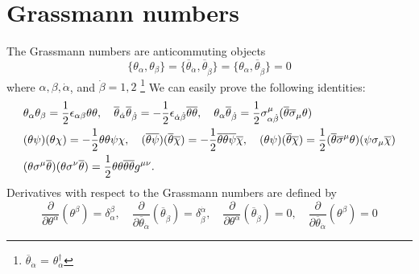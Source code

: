 \documentclass[12pt]{report}
\begin{document}
\section{Grassmann numbers} \label{app: grassmann_numbers}
The Grassmann numbers are anticommuting objects
\begin{equation}
\{\theta_{\alpha}, \theta_{\beta}\} = \{\overline{\theta}_{\dot{\alpha}}, \overline{\theta}_{\dot{\beta}}\} = \{\theta_{\alpha}, \overline{\theta}_{\dot{\beta}}\} = 0
\end{equation}
where $\alpha, \beta, \dot{\alpha}$, and $\dot{\beta} = 1, 2$ \footnote{$\overline{\theta}_{\dot{\alpha}}$ = $\theta_{\alpha}^{\dagger}$ }
We can easily prove the following identities:
\begin{align}
&\theta_{\alpha} \theta_{\beta} = \frac{1}{2} \epsilon_{\alpha \beta} \theta \theta, \quad 
\overline{\theta}_{\dot{\alpha}} \overline{\theta}_{\dot{\beta}} = -\frac{1}{2} \epsilon_{\dot{\alpha} \dot{\beta}} \overline{\theta} \overline{\theta}, \quad 
\theta_{\alpha} \overline{\theta}_{\dot{\beta}} = \frac{1}{2} \sigma^{\mu}_{\alpha \dot{\beta}} (\overline{\theta} \overline{\sigma}_{\mu} \theta) \notag \\
& (\theta \psi)(\theta \chi) = - \frac{1}{2}\theta \theta \psi \chi, \quad 
(\overline{\theta} \overline{\psi})(\overline{\theta} \overline{\chi}) = - \frac{1}{2} \overline{\theta} \overline{\theta} \overline{\psi} \overline{\chi}, \quad 
(\theta \psi)(\overline{\theta} \overline{\chi}) = \frac{1}{2}(\overline{\theta} \overline{\sigma}^{\mu} \theta)(\psi \sigma_{\mu} \overline{\chi}) \notag \\
& (\theta \sigma^{\mu} \overline{\theta})(\theta \sigma^{\nu} \overline{\theta}) = \frac{1}{2} \theta \theta \overline{\theta} \overline{\theta} g^{\mu \nu} .
\end{align}
Derivatives with respect to the Grassmann numbers are defined by
\begin{equation}
\frac{\partial}{\partial \theta^{\alpha}}(\theta^{\beta}) = \delta^{\beta}_{\alpha}, \quad
\frac{\partial}{\partial \overline{\theta}_{\dot{\alpha}}}(\overline{\theta}_{\dot{\beta}}) = \delta^{\dot{\alpha}}_{\dot{\beta}}, \quad 
\frac{\partial}{\partial \theta^{\alpha}}(\overline{\theta}_{\dot{\beta}}) = 0, \quad 
\frac{\partial}{\partial \overline{\theta}_{\dot{\alpha}}}(\theta^{\beta}) = 0
\end{equation}
\end{document}
